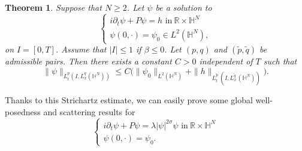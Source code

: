 \documentclass[10pt,leqno]{amsart}
\newtheorem{thm}{Theorem}[section]
\numberwithin{equation}{section}
\newcommand{\field}[1]{\mathbb{#1}}
\newcommand{\R}{\field{R}}          		%
\newcommand{\Hy}{\field{H}}
\begin{document}
\begin{thm}
\label{introstri}
Suppose that $N\geq 2$. Let $\psi$ be a solution to
$$\begin{cases} i\partial_t \psi +P \psi=h\mbox{ in}\ \R\times \Hy^N\\ \psi(0,\cdot)=\psi_0  \in L^2 (\Hy^N ),\end{cases}$$
on $I=[0,T]$. Assume that $|I|\leq 1$ if $\beta \leq 0$. Let $(p,q)$ and $(\tilde{p},\tilde{q})$ be admissible pairs. Then there exists a constant $C>0$ independent of  $T$ such that
\begin{equation*}
\|\psi\|_{L_t^p (I,L_x^q (\Hy^N))}\leq C \big(\|\psi_0\|_{L^2 (\Hy^N)} +\|h\|_{L_t^{\tilde{p}^\prime }(I, L_x^{\tilde{q}^\prime} (\Hy^N))}\big).
\end{equation*}
\end{thm}

Thanks to this Strichartz estimate, we can easily prove some global well-posedness and scattering results for
\begin{equation}
\label{4NLSeqintro}
\begin{cases}i\partial_t \psi +P \psi =\lambda|\psi|^{2\sigma}\psi \mbox{ in}\ \R\times \Hy^N\\ \psi(0,\cdot)=\psi_0.\end{cases}
\end{equation}
\end{document}
